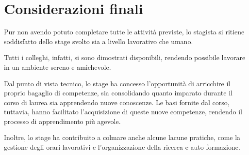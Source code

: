 \section{Considerazioni finali}
Pur non avendo potuto completare tutte le attività previste, lo stagista si ritiene soddisfatto dello stage svolto sia a livello lavorativo che umano. 

Tutti i colleghi, infatti, si sono dimostrati disponibili, rendendo possibile lavorare in un ambiente sereno e amichevole. 

Dal punto di vista tecnico, lo stage ha concesso l'opportunità di arricchire il proprio bagaglio di competenze, sia 
consolidando quanto imparato durante il corso di laurea sia apprendendo nuove conoscenze.
Le basi fornite dal corso, tuttavia, hanno facilitato l'acquisizione di queste nuove competenze, rendendo il processo di apprendimento più agevole.

Inoltre, lo stage ha contribuito a colmare anche alcune lacune pratiche, come la gestione degli orari lavorativi e l'organizzazione della ricerca e auto-formazione. 